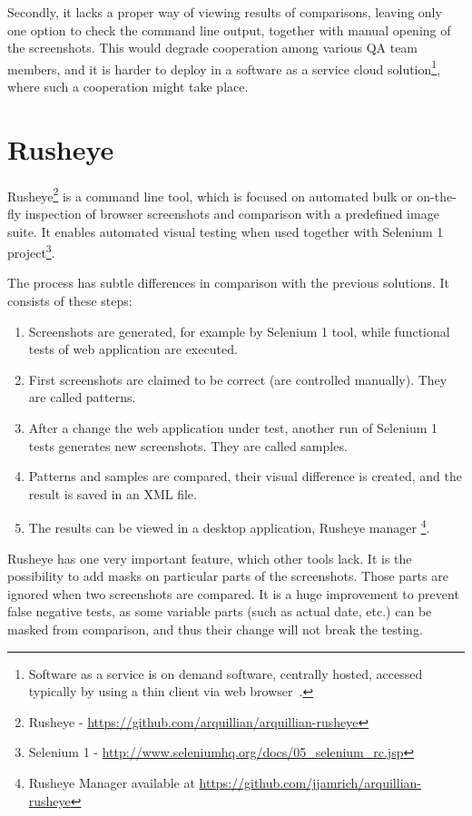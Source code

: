 \documentclass[11pt,oneside,final]{fithesis2}
\begin{document}
   Secondly, it lacks a proper way of viewing results of comparisons, leaving only one option to check the command line output, together with manual opening of the screenshots. This would degrade
   cooperation among various QA team members, and it is harder to deploy in a software as a service cloud solution\footnote{Software as a service is on demand software, centrally hosted, 
   accessed typically by using a thin client via web browser~\citep{sass}.}, where such a cooperation might take place.

  \section{Rusheye}
  \label{sec:rusheye}
  Rusheye\footnote{Rusheye - \url{https://github.com/arquillian/arquillian-rusheye}} is a command line tool, which is focused on automated bulk or on-the-fly inspection of browser screenshots and comparison with a predefined image suite. It enables automated
  visual testing when used together with Selenium 1 project\footnote{Selenium 1 - \url{http://www.seleniumhq.org/docs/05_selenium_rc.jsp}}.
  
  The process has subtle differences in comparison with the previous solutions. It consists of these steps:
  
  \begin{enumerate}
   \item Screenshots are generated, for example by Selenium 1 tool, while functional tests of web application are executed.
   \item First screenshots are claimed to be correct (are controlled manually). They are called patterns.
   \item After a change the web application under test, another run of Selenium 1 tests generates new screenshots. They are called samples.
   \item Patterns and samples are compared, their visual difference is created, and the result is saved in an XML file.
   \item The results can be viewed in a desktop application, Rusheye manager \footnote{Rusheye Manager available at \url{https://github.com/jjamrich/arquillian-rusheye}}.
  \end{enumerate}
  
  Rusheye has one very important feature, which other tools lack. It is the possibility to add masks on particular parts of the screenshots. Those parts are ignored when two screenshots are
  compared. It is a huge improvement to prevent false negative tests, as some variable parts (such as actual date, etc.) can be masked from comparison, and thus their change
  will not break the testing.
  
\end{document}
